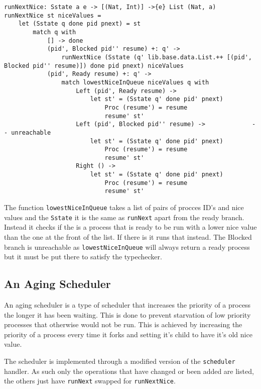 \documentclass[logo,bsc,singlespacing,parskip]{infthesis}
\begin{document}
\begin{lstlisting}[language=unison]
runNextNice: Sstate a e -> [(Nat, Int)] ->{e} List (Nat, a)
runNextNice st niceValues = 
    let (Sstate q done pid pnext) = st
        match q with
            [] -> done
            (pid', Blocked pid'' resume) +: q' -> 
                runNextNice (Sstate (q' lib.base.data.List.++ [(pid', Blocked pid'' resume)]) done pid pnext) niceValues
            (pid', Ready resume) +: q' ->
                match lowestNiceInQueue niceValues q with
                    Left (pid', Ready resume) -> 
                        let st' = (Sstate q' done pid' pnext)
                            Proc (resume') = resume
                            resume' st'
                    Left (pid', Blocked pid'' resume) ->             -- unreachable
                        let st' = (Sstate q' done pid' pnext)
                            Proc (resume') = resume
                            resume' st'
                    Right () -> 
                        let st' = (Sstate q' done pid' pnext)
                            Proc (resume') = resume
                            resume' st'
\end{lstlisting}

The function \texttt{lowestNiceInQueue} takes a list of pairs of procces ID's
and nice values and the \texttt{Sstate} it is the same as \texttt{runNext}
apart from the ready branch. Instead it checks if the is a process that is
ready to be run with a lower nice value than the one at the front of the list.
If there is it runs that instead. The Blocked branch is unreachable as
\texttt{lowestNiceInQueue} will always return a ready process but it must be
put there to satisfy the typechecker.

\subsection{An Aging Scheduler}
\label{aging}

An aging scheduler is a type of scheduler that increases the priority of a
process the longer it has been waiting. This is done to prevent starvation of
low priority processes that otherwise would not be run. This is achieved by
increasing the priority of a process every time it forks and setting it's child
to have it's old nice value.

The scheduler is implemented through a modified version of the
\texttt{scheduler} handler. As such only the operations that have changed or
been added are listed, the others just have \texttt{runNext} swapped for
\texttt{runNextNice}.
\end{document}
